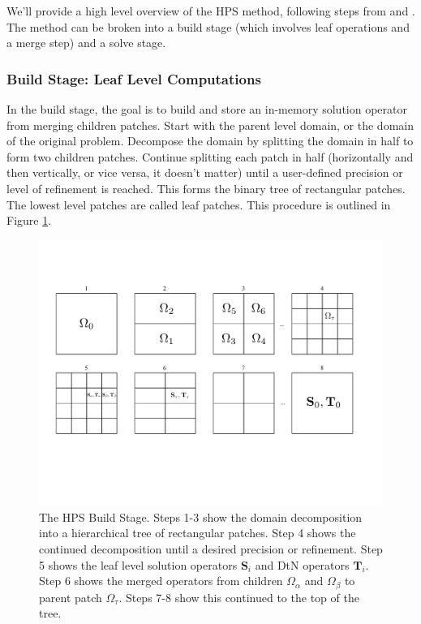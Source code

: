 We'll provide a high level overview of the HPS method, following steps from \cite{gillman2014direct} and \cite{martinsson2015hierarchical}. The method can be broken into a build stage (which involves leaf operations and a merge step) and a solve stage.

\subsubsection{Build Stage: Leaf Level Computations}

In the build stage, the goal is to build and store an in-memory solution operator from merging children patches. Start with the parent level domain, or the domain of the original problem. Decompose the domain by splitting the domain in half to form two children patches. Continue splitting each patch in half (horizontally and then vertically, or vice versa, it doesn't matter) until a user-defined precision or level of refinement is reached. This forms the binary tree of rectangular patches. The lowest level patches are called leaf patches. This procedure is outlined in Figure \ref{fig:build}.

\begin{figure}
    \centering
    \includegraphics[width=\columnwidth]{figures/build_figure.pdf}
    \caption{The HPS Build Stage. Steps 1-3 show the domain decomposition into a hierarchical tree of rectangular patches. Step 4 shows the continued decomposition until a desired precision or refinement. Step 5 shows the leaf level solution operators $\textbf{S}_{i}$ and DtN operators $\textbf{T}_{i}$. Step 6 shows the merged operators from children $\Omega_{\alpha}$ and $\Omega_{\beta}$ to parent patch $\Omega_{\tau}$. Steps 7-8 show this continued to the top of the tree.}
    \label{fig:build}
\end{figure}

